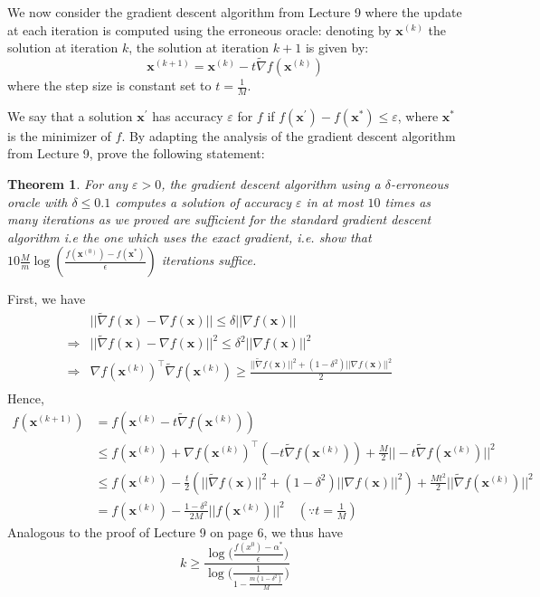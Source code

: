 \documentclass[11pt]{article}
\newcommand{\eps}{\varepsilon}
\newtheorem*{theorem*}{Theorem}
\theoremstyle{remark}
\newcommand{\bx}{\mathbf{x}}
\begin{document}
We now consider the gradient descent algorithm from Lecture 9 where the update
at each iteration is computed using the erroneous oracle: denoting by
$\bx^{(k)}$ the solution at iteration $k$, the solution at iteration $k+1$ is
given by:
\begin{displaymath}
    \bx^{(k+1)} = \bx^{(k)} - t\tilde{\nabla} f(\bx^{(k)})
\end{displaymath}
where the step size is constant set to $t=\frac{1}{M}$.

We say that a solution $\bx^{'}$ has accuracy $\eps$ for $f$ if $f(\bx^{'})
- f(\bx^*)\leq \eps$, where $\bx^*$ is the minimizer of $f$. By adapting the
analysis of the gradient descent algorithm from Lecture 9, prove the following
statement:

\begin{theorem*}
   For any $\eps > 0$, the
    gradient descent algorithm using a $\delta$-erroneous oracle with $\delta
    \leq 0.1$ computes a solution of accuracy $\eps$ in at most $10
    $ times as many
    iterations as we proved are sufficient for the standard gradient descent algorithm \emph{i.e} the one
    which uses the exact gradient, i.e. 
   show that $10 \frac{M}{m} \log \left(\frac{f(\bx^{(0)}) - f(\bx^*)}{\epsilon}\right)$ iterations suffice.
\end{theorem*}


\color{blue}
First, we have 
\begin{align*}
& || \tilde{\nabla}f(\bx) - \nabla f(\bx) || \leq \delta || \nabla f(\bx) || &\\
\Rightarrow & || \tilde{\nabla}f(\bx) - \nabla f(\bx) ||^2 \leq \delta^2 || \nabla f(\bx) ||^2 &\\
\Rightarrow & \nabla f(\bx^{(k)})^\intercal \tilde{\nabla}f(\bx^{(k)}) \geq \frac{|| \tilde{\nabla}f(\bx)||^2+(1-\delta^2) ||\nabla f(\bx) ||^2}{2}&\\
\end{align*}
Hence,
\begin{align*}
f(\bx^{(k+1)}) &= f(\bx^{(k)}-t\tilde{\nabla}f(\bx^{(k)})) &\\
&\leq f(\bx^{(k)}) + \nabla f(\bx^{(k)})^\intercal (-t \tilde{\nabla}f(\bx^{(k)})) + \frac{M}{2}||-t\tilde{\nabla}f(\bx^{(k)})||^2 &\\
&\leq f(\bx^{(k)}) -\frac{t}{2}(|| \tilde{\nabla}f(\bx)||^2+(1-\delta^2) ||\nabla f(\bx) ||^2)+\frac{Mt^2}{2}||\tilde{\nabla}f(\bx^{(k)})||^2 &\\
&=f(\bx^{(k)})-\frac{1-\delta^2}{2M}||f(\bx^{(k)})||^2 \quad (\because t=\frac{1}{M})
\end{align*}
Analogous to the proof of Lecture 9 on page 6, we thus have
$$k \geq \frac{\log\Big(\frac{f(x^{0})-\alpha^*}{\epsilon}\Big)}{\log\Big(\frac{1}{1-\frac{m(1-\delta^2)}{M}}\Big)}$$
\end{document}
